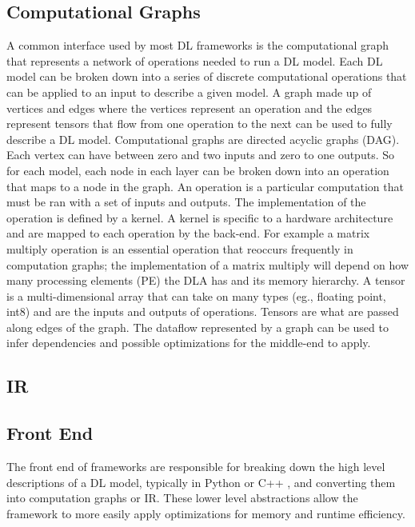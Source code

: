 \subsection{Computational Graphs}
A common interface used by most DL frameworks is the computational graph
\cite{tensorflow} \cite{cntk} that represents a network of operations needed to
run a DL model. Each DL model can be broken down into a series of discrete
computational operations that can be applied to an input to describe a given
model. A graph made up of vertices and edges where the vertices represent an
operation and the edges represent tensors that flow from one operation to the
next can be used to fully describe a DL model. Computational graphs are
directed acyclic graphs (DAG).  Each vertex can have between zero and two
inputs and zero to one outputs. So for each model, each node in each layer can
be broken down into an operation that maps to a node in the graph. An operation
is a particular computation that must be ran with a set of inputs and outputs.
The implementation of the operation is defined by a kernel. A kernel is
specific to a hardware architecture and are mapped to each operation by the
back-end. For example a matrix multiply operation is an essential operation
that reoccurs frequently in computation graphs; the implementation of a matrix
multiply will depend on how many processing elements (PE) the DLA has and its
memory hierarchy. A tensor is a multi-dimensional array that can take on many
types (eg., floating point, int8) and are the inputs and outputs of operations.
Tensors are what are passed along edges of the graph. The dataflow represented
by a graph can be used to infer dependencies and possible optimizations for the
middle-end to apply.





\subsection{IR}


\subsection{Front End}
The front end of frameworks are responsible for breaking down the high level
descriptions of a DL model, typically in Python or C++ \cite{tensorflow}, and
converting them into computation graphs or IR. These lower level abstractions
allow the framework to more easily apply optimizations for memory and runtime
efficiency.

